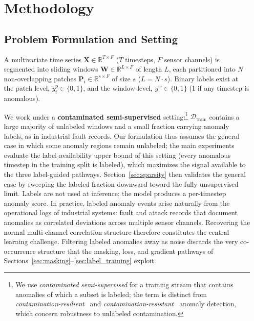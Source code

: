 
\section{Methodology}
\label{sec:method}

\subsection{Problem Formulation and Setting}
\label{sec:problem_formulation}

A multivariate time series $\mathbf{X} \in \mathbb{R}^{T \times F}$ ($T$ timesteps, $F$ sensor channels)
is segmented into sliding windows $\mathbf{W} \in \mathbb{R}^{L \times F}$ of length $L$, each
partitioned into $N$ non-overlapping patches $\mathbf{P}_i \in \mathbb{R}^{s \times F}$ of size $s$
($L = N \cdot s$).
Binary labels exist at the patch level, $y^p_i \in \{0,1\}$, and the window level,
$y^w \in \{0,1\}$ (1 if any timestep is anomalous).

We work under a \textbf{contaminated semi-supervised} setting:\footnote{%
  We use \emph{contaminated semi-supervised} for a training stream that contains anomalies of
  which a subset is labeled; the term is distinct from \emph{contamination-resilient}~\cite{xu2023rosas}
  and \emph{contamination-resistant}~\cite{wang2022hscl} anomaly detection, which concern
  robustness to unlabeled contamination.}
$\mathcal{D}_{\mathrm{train}}$ contains a large majority of unlabeled windows and a small
fraction carrying anomaly labels, as in industrial fault records.
Our formulation thus assumes the general case in which some anomaly regions remain unlabeled;
the main experiments evaluate the label-availability upper bound of this setting (every anomalous
timestep in the training split is labeled), which maximizes the signal available to the three
label-guided pathways.
Section~\ref{sec:sparsity} then validates the general case by sweeping the labeled fraction
downward toward the fully unsupervised limit.
Labels are not used at inference; the model produces a per-timestep anomaly score.
In practice, labeled anomaly events arise naturally from the operational logs of industrial
systems: fault and attack records that document anomalies as correlated deviations across multiple
sensor channels.
Recovering the normal multi-channel correlation structure therefore constitutes the central
learning challenge.
Filtering labeled anomalies away as noise discards the very co-occurrence structure that the
masking, loss, and gradient pathways of Sections~\ref{sec:masking}--\ref{sec:label_training}
exploit.

